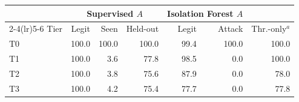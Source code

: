\begin{tabular}{@{}lrrrrrr@{}}
\toprule
 & \multicolumn{3}{c}{Supervised $A$} & \multicolumn{2}{c}{Isolation Forest $A$} & \\
\cmidrule(lr){2-4}\cmidrule(lr){5-6}
Tier & Legit & Seen & Held-out & Legit & Attack & Thr.-only$^{a}$ \\
\midrule
T0 & 100.0 & 100.0 & 100.0 & 99.4 & 100.0 & 100.0 \\
T1 & 100.0 & 3.6 & 77.8 & 98.5 & 0.0 & 100.0 \\
T2 & 100.0 & 3.8 & 75.6 & 87.9 & 0.0 & 78.0 \\
T3 & 100.0 & 4.2 & 75.4 & 77.7 & 0.0 & 77.8 \\
\bottomrule
\end{tabular}